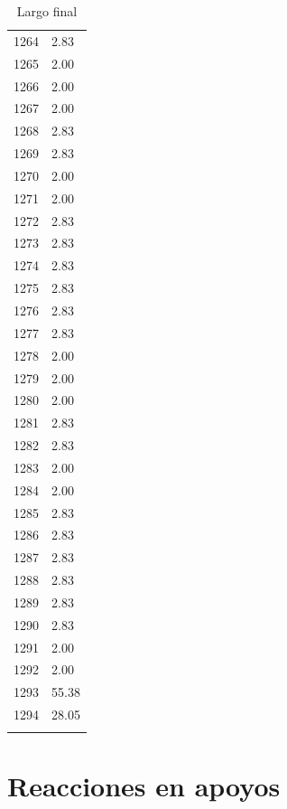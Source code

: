 \documentclass[a4paper,11pt]{article}
\begin{document}
\begin{center}
\begin{longtable}{|R{1.5cm}|R{2.5cm}|}
 1264  &         2.83 \\ 
 1265  &         2.00 \\ 
 1266  &         2.00 \\ 
 1267  &         2.00 \\ 
 1268  &         2.83 \\ 
 1269  &         2.83 \\ 
 1270  &         2.00 \\ 
 1271  &         2.00 \\ 
 1272  &         2.83 \\ 
 1273  &         2.83 \\ 
 1274  &         2.83 \\ 
 1275  &         2.83 \\ 
 1276  &         2.83 \\ 
 1277  &         2.83 \\ 
 1278  &         2.00 \\ 
 1279  &         2.00 \\ 
 1280  &         2.00 \\ 
 1281  &         2.83 \\ 
 1282  &         2.83 \\ 
 1283  &         2.00 \\ 
 1284  &         2.00 \\ 
 1285  &         2.83 \\ 
 1286  &         2.83 \\ 
 1287  &         2.83 \\ 
 1288  &         2.83 \\ 
 1289  &         2.83 \\ 
 1290  &         2.83 \\ 
 1291  &         2.00 \\ 
 1292  &         2.00 \\ 
 1293  &        55.38 \\ 
 1294  &        28.05 \\ 
\bottomrule[0.8mm]                               
\caption{Largo final}             
\end{longtable}                                  
\end{center}                                     

\newpage       

\section{Reacciones en apoyos}
\end{document}
